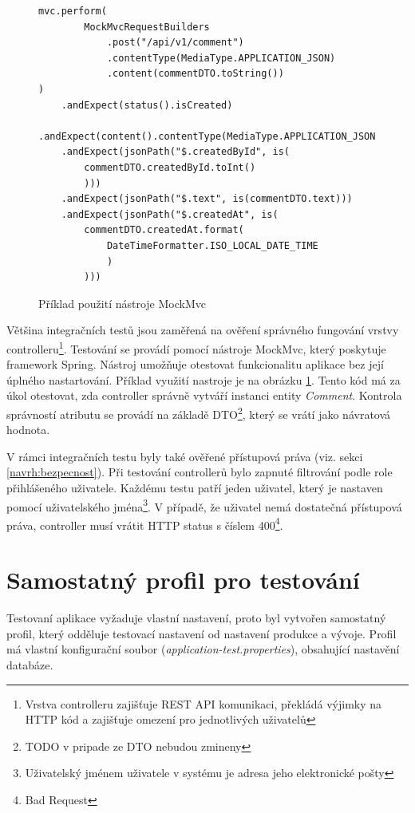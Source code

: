         \begin{figure}
        \begin{verbatim}
mvc.perform(
        MockMvcRequestBuilders
            .post("/api/v1/comment")
            .contentType(MediaType.APPLICATION_JSON)
            .content(commentDTO.toString())
)
    .andExpect(status().isCreated)
    .andExpect(content().contentType(MediaType.APPLICATION_JSON))
    .andExpect(jsonPath("$.createdById", is(
        commentDTO.createdById.toInt()
        )))
    .andExpect(jsonPath("$.text", is(commentDTO.text)))
    .andExpect(jsonPath("$.createdAt", is(
        commentDTO.createdAt.format(
            DateTimeFormatter.ISO_LOCAL_DATE_TIME
            )
        )))

        \end{verbatim}
        \caption{Příklad použití nástroje MockMvc} 
        \label{code:mockmvc}
    \end{figure}
    Většina integračních testů jsou zaměřená na ověření správného fungování vrstvy controlleru\footnote{Vrstva controlleru zajišťuje REST API komunikaci, překládá výjimky na HTTP kód a zajišťuje omezení pro jednotlivých uživatelů}. Testování se provádí pomocí nástroje MockMvc\cite{mock-mvc}, který poskytuje framework Spring. Nástroj umožňuje otestovat funkcionalitu aplikace bez její úplného nastartování. Příklad využití nastroje je na obrázku \ref{code:mockmvc}. Tento kód má za úkol otestovat, zda controller správně vytváří instanci entity \textit{Comment}. Kontrola správností atributu se provádí na základě DTO\footnote{TODO v pripade ze DTO nebudou zmineny}, který se vrátí jako návratová hodnota.
    
    V rámci integračních testu byly také ověřené přístupová práva (viz. sekci \ref{navrh:bezpecnost}). Při testování controllerů bylo zapnuté filtrování podle role přihlášeného uživatele. Každému testu patří jeden uživatel, který je nastaven pomocí uživatelského jména\footnote{Uživatelský jménem uživatele v systému je adresa jeho elektronické pošty}. V případě, že uživatel nemá dostatečná přístupová práva, controller musí vrátit HTTP status s číslem 400\footnote{Bad Request}.
    
\section{Samostatný profil pro testování}

    Testovaní aplikace vyžaduje vlastní nastavení, proto byl vytvořen samostatný profil, který odděluje testovací nastavení od nastavení produkce a vývoje. Profil má vlastní konfigurační soubor (\textit{application-test.properties}), obsahující nastavění databáze.
    

